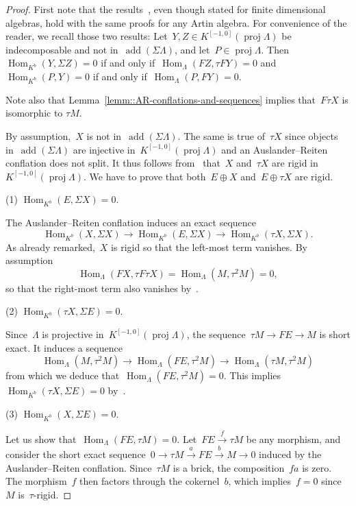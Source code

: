 \documentclass{amsart}
\theoremstyle{definition}
\newcommand{\Hom}[1]{\operatorname{Hom}_{#1}}
\newcommand{\susp}{\Sigma}
\newcommand{\add}{\operatorname{add}}
\newcommand{\proj}{\operatorname{proj}}
\begin{document}
\begin{proof}
First note that the results~\cite[Lemmas 3.4 and 3.5]{AdachiIyamaReiten}, even though stated for finite dimensional algebras, hold with the same proofs for any Artin algebra.
For convenience of the reader, we recall those two results: Let~$Y, Z \in K^{[-1,0]}(\proj\Lambda)$ be indecomposable and not in~$\add(\susp\Lambda)$, and let~$P\in\proj\Lambda$. Then~$\Hom{K^b}(Y,\susp Z)=0$ if and only if~$\Hom{\Lambda}(FZ,\tau FY)=0$ and~$\Hom{K^b}(P,Y)=0$ if and only if~$\Hom{\Lambda}(P,FY)=0$.

Note also that Lemma~\ref{lemm::AR-conflations-and-sequences} implies that~$F\tau X$ is isomorphic to $\tau M$.

By assumption,~$X$ is not in~$\add(\susp\Lambda)$.
The same is true of~$\tau X$ since objects in~$\add(\susp\Lambda)$ are injective in~$K^{[-1,0]}(\proj\Lambda)$ and an Auslander--Reiten conflation does not split.
It thus follows from~\cite[Lemma 3.4 ]{AdachiIyamaReiten} that~$X$ and~$\tau X$ are rigid in $K^{[-1,0]}(\proj\Lambda)$.
We have to prove that both~$E\oplus X$ and~$E\oplus\tau X$ are rigid.

\vspace{7pt}
\noindent (1) $\Hom{K^b}(E,\susp X) = 0$.
\vspace{4pt}

The Auslander--Reiten conflation induces an exact sequence
\[
\Hom{K^b}(X,\susp X) \to \Hom{K^b}(E,\susp X) \to \Hom{K^b}(\tau X,\susp X).
\]
As already remarked,~$X$ is rigid so that the left-most term vanishes.
By assumption
\[
\Hom{\Lambda}(FX,\tau F\tau X) = \Hom{\Lambda}(M,\tau^2 M)=0,
\]
so that the right-most term also vanishes by~\cite[Lemma 3.4 ]{AdachiIyamaReiten}.

\vspace{7pt}
\noindent (2) $\Hom{K^b}(\tau X,\susp E) = 0$.
\vspace{4pt}

Since~$\Lambda$ is projective in~$K^{[-1,0]}(\proj\Lambda)$, the sequence~$\tau M \to FE \to M$ is short exact.
It induces a sequence
\[
\Hom{\Lambda}(M,\tau^2 M) \to \Hom{\Lambda}(FE,\tau^2 M) \to \Hom{\Lambda}(\tau M,\tau^2 M)
\]
from which we deduce that~$\Hom{\Lambda}(FE,\tau^2 M)=0$.
This implies~$\Hom{K^b}(\tau X,\susp E) = 0$ by~\cite[Lemma 3.4 ]{AdachiIyamaReiten}.

\vspace{7pt}
\noindent (3) $\Hom{K^b}(X,\susp E) = 0$.
\vspace{4pt}

Let us show that~$\Hom{\Lambda}(FE,\tau M)=0$.
Let~$FE \xrightarrow{f} \tau M$ be any morphism, and consider the short exact sequence~$0\to \tau M \xrightarrow{a} FE \xrightarrow{b} M \to 0$ induced by the Auslander--Reiten conflation.
Since~$\tau M$ is a brick, the composition~$fa$ is zero.
The morphism~$f$ then factors through the cokernel~$b$, which implies~$f=0$ since~$M$ is~$\tau$-rigid.


\end{proof}
\end{document}

